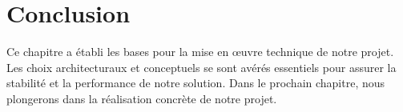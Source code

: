     \section*{Conclusion}
\par Ce chapitre a établi les bases pour la mise en œuvre technique de notre projet. Les choix architecturaux et conceptuels se sont avérés essentiels pour assurer la stabilité et la performance de notre solution. Dans le prochain chapitre, nous plongerons dans la réalisation concrète de notre projet.